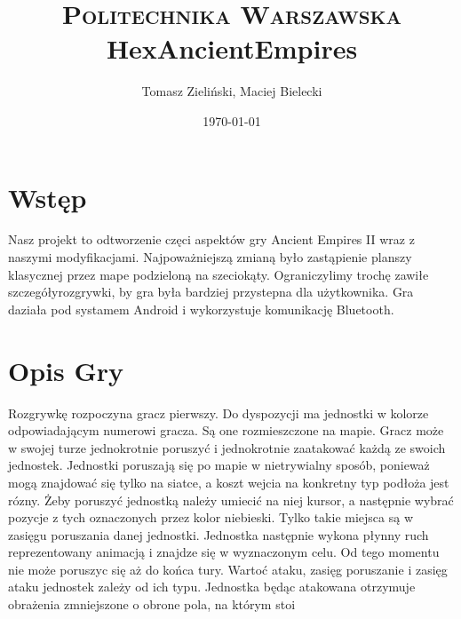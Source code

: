 \documentclass[paper=a4, fontsize=11pt]{scrartcl} %
\title{	
\normalfont \normalsize 
\textsc{Politechnika Warszawska} \\ [25pt] %
\huge HexAncientEmpires \\ %
}
\author{Tomasz Zieliński,  Maciej Bielecki}
\date{\normalsize\today}
\numberwithin{equation}{section} %
\numberwithin{figure}{section} %
\numberwithin{table}{section} %
\begin{document}
\maketitle 

\section{Wstęp}
Nasz projekt to odtworzenie częci aspektów gry Ancient Empires II wraz z naszymi modyfikacjami. Najpoważniejszą zmianą było zastąpienie planszy klasycznej przez mape podzieloną na szeciokąty. Ograniczylimy trochę zawiłe szczegółyrozgrywki, by gra była bardziej przystepna dla użytkownika. Gra daziała pod systamem Android i wykorzystuje komunikację Bluetooth. 

\section{Opis Gry}
Rozgrywkę rozpoczyna gracz pierwszy. Do dyspozycji ma jednostki w kolorze odpowiadającym numerowi gracza. Są one rozmieszczone na mapie.
Gracz może w swojej turze jednokrotnie poruszyć i jednokrotnie zaatakować każdą ze swoich jednostek. Jednostki poruszają się po mapie w nietrywialny sposób, ponieważ mogą znajdować się tylko na siatce, a koszt wejcia na konkretny typ podłoża jest rózny. Żeby poruszyć jednostką należy umiecić na niej kursor, a następnie wybrać pozycje z tych oznaczonych przez kolor niebieski. Tylko takie miejsca są w zasięgu poruszania danej jednostki. Jednostka następnie wykona płynny ruch reprezentowany animacją i znajdze się w wyznaczonym celu. Od tego momentu nie może poruszyc się aż do końca tury.  Wartoć ataku, zasięg poruszanie i zasięg ataku jednostek zależy od ich typu. Jednostka będąc atakowana otrzymuje obrażenia zmniejszone o obrone pola, na którym stoi


\end{document}
